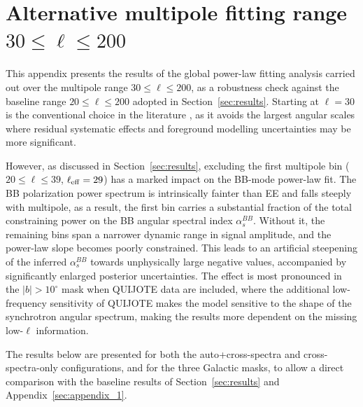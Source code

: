 \section{Alternative multipole fitting range $30 \leq \ell \leq 200$}
\label{sec:appendix_2}

This appendix presents the results of the global power-law fitting analysis carried out over the multipole range $30 \leq \ell \leq 200$, as a robustness check against the baseline range $20 \leq \ell \leq 200$ adopted in Section~\ref{sec:results}. Starting at $\ell = 30$ is the conventional choice in the literature \citep{QUIJOTE_IV, Martire_2022}, as it avoids the largest angular scales where residual systematic effects and foreground modelling uncertainties may be more significant.

However, as discussed in Section~\ref{sec:results}, excluding the first multipole bin ($20 \leq \ell \leq 39$, $\ell_{\rm eff} = 29$) has a marked impact on the BB-mode power-law fit. The BB polarization power spectrum is intrinsically fainter than EE and falls steeply with multipole, as a result, the first bin carries a substantial fraction of the total constraining power on the BB angular spectral index $\alpha_s^{BB}$. Without it, the remaining bins span a narrower dynamic range in signal amplitude, and the power-law slope becomes poorly constrained. This leads to  an artificial steepening of the inferred $\alpha_s^{BB}$ towards unphysically large negative values, accompanied by significantly enlarged posterior uncertainties. The effect is most pronounced in the $|b| > 10^\circ$ mask when QUIJOTE data are included, where the additional low-frequency sensitivity of QUIJOTE makes the model sensitive to the shape of the synchrotron angular spectrum, making the results more dependent on the missing low-$\ell$ information.

The results below are presented for both the auto+cross-spectra and cross-spectra-only configurations, and for the three Galactic masks, to allow a direct comparison with the baseline results of Section~\ref{sec:results} and Appendix~\ref{sec:appendix_1}.

\paragraph{}


